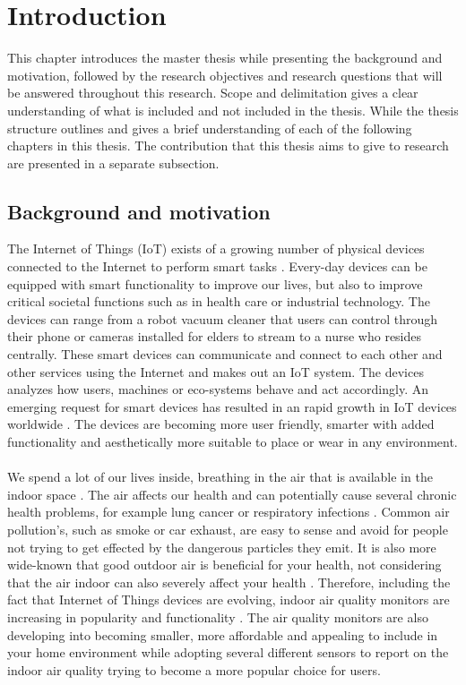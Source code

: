 \chapter{Introduction}
This chapter introduces the master thesis while presenting the background and motivation, followed by the research objectives and research questions that will be answered throughout this research. Scope and delimitation gives a clear understanding of what is included and not included in the thesis. While the thesis structure outlines and gives a brief understanding of each of the following chapters in this thesis. The contribution that this thesis aims to give to research are presented in a separate subsection. 

\section{Background and motivation}
The Internet of Things (IoT) exists of a growing number of physical devices connected to the Internet to perform smart tasks \cite{IoTSurveyAl-Fuqaha}. Every-day devices can be equipped with smart functionality to improve our lives, but also to improve critical societal functions such as in health care or industrial technology. The devices can range from a robot vacuum cleaner that users can control through their phone or cameras installed for elders to stream to a nurse who resides centrally. These smart devices can communicate and connect to each other and other services using the Internet and makes out an IoT system. The devices analyzes how users, machines or eco-systems behave and act accordingly. An emerging request for smart devices has resulted in an rapid growth in IoT devices worldwide \cite{IoTAndPrivacy}. The devices are becoming more user friendly, smarter with added functionality and aesthetically more suitable to place or wear in any environment. 
\\\\
We spend a lot of our lives inside, breathing in the air that is available in the indoor space \cite{IndoorAirQualityMonitorIoT}. The air affects our health and can potentially cause several chronic health problems, for example lung cancer or respiratory infections \cite{IAQMonitorReview}. Common air pollution's, such as smoke or car exhaust, are easy to sense and avoid for people not trying to get effected by the dangerous particles they emit. It is also more wide-known that good outdoor air is beneficial for your health, not considering that the air indoor can also severely affect your health \cite{IndoorAirQuality}. Therefore, including the fact that Internet of Things devices are evolving, indoor air quality monitors are increasing in popularity and functionality \cite{SecurityAndDataIntInAQM}. The air quality monitors are also developing into becoming smaller, more affordable and appealing to include in your home environment while adopting several different sensors to report on the indoor air quality trying to become a more popular choice for users. 

